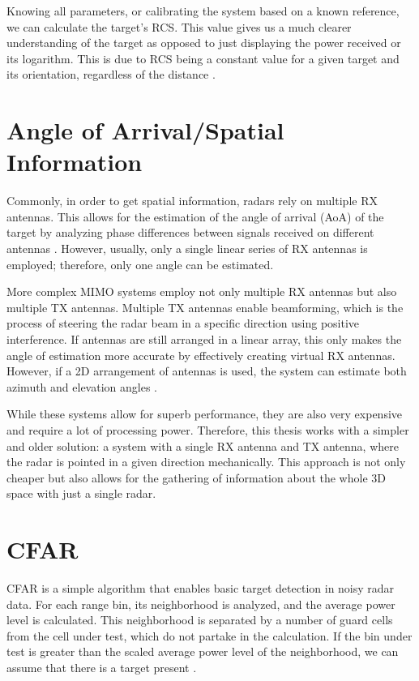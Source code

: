 Knowing all parameters, or calibrating the system based on a known reference, we can calculate the target's RCS.
This value gives us a much clearer understanding of the target as opposed to just displaying the power received or its logarithm.
This is due to RCS being a constant value for a given target and its orientation, regardless of the distance \cite{richards2022}.

\section{Angle of Arrival/Spatial Information}

Commonly, in order to get spatial information, radars rely on multiple RX antennas.
This allows for the estimation of the angle of arrival (AoA) of the target by analyzing phase differences between signals received on different antennas \cite{suleymanov2016}.
However, usually, only a single linear series of RX antennas is employed; therefore, only one angle can be estimated.

More complex MIMO systems employ not only multiple RX antennas but also multiple TX antennas.
Multiple TX antennas enable beamforming, which is the process of steering the radar beam in a specific direction using positive interference.
If antennas are still arranged in a linear array, this only makes the angle of estimation more accurate by effectively creating virtual RX antennas.
However, if a 2D arrangement of antennas is used, the system can estimate both azimuth and elevation angles \cite{sandeep2018}.

While these systems allow for superb performance, they are also very expensive and require a lot of processing power.
Therefore, this thesis works with a simpler and older solution: a system with a single RX antenna and TX antenna, where the radar is pointed in a given direction mechanically.
This approach is not only cheaper but also allows for the gathering of information about the whole 3D space with just a single radar.

\section{CFAR}


CFAR is a simple algorithm that enables basic target detection in noisy radar data.
For each range bin, its neighborhood is analyzed, and the average power level is calculated.
This neighborhood is separated by a number of guard cells from the cell under test, which do not partake in the calculation.
If the bin under test is greater than the scaled average power level of the neighborhood, we can assume that there is a target present \cite{jankiraman2018}.


